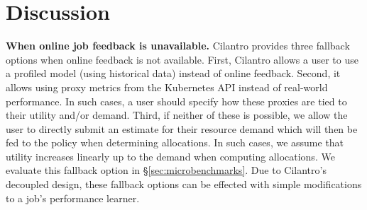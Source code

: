 


\section{Discussion}
\label{sec:discussion}


\textbf{When online job feedback is unavailable.}
Cilantro provides three fallback options when online feedback is not available.
First, Cilantro allows a user to use a profiled model (using historical data) instead of
online feedback.
Second, it allows using proxy metrics from the Kubernetes API instead of real-world performance.
In such cases, a user should specify how these proxies are tied to their utility
and/or demand.
Third, if neither of these is possible, we allow the user to directly submit an estimate for their resource
demand  which will then be fed to the policy when determining allocations.
In such cases, we assume that utility increases linearly up to the demand when computing
allocations.
We evaluate this fallback option in \S\ref{sec:microbenchmarks}.
Due to Cilantro's decoupled design, these fallback options can be effected with simple modifications
to a job's performance learner.


